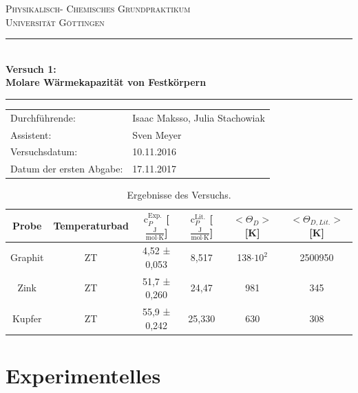 \documentclass[12pt,a4paper,titlepage,headinclude,bibtotoc]{scrartcl}
\begin{document}
\begin{titlepage}
\centering
\textsc{\Large Physikalisch- Chemisches Grundpraktikum\\[1.5ex] Universität Göttingen}

\vspace*{0.5cm}

\rule{\textwidth}{1pt}\\[0.5cm]
{\huge \bfseries
  Versuch 1: \\[1.5ex]
  Molare Wärmekapazität von Festkörpern }\\[0.5cm]
\rule{\textwidth}{1pt}

\vspace*{0.5cm}


\begin{Large}
\begin{tabular}{ll}
Durchführende: &  Isaac Maksso, Julia Stachowiak\\
Assistent: & Sven Meyer \\
 Versuchsdatum: & 10.11.2016\\
 Datum der ersten Abgabe: & 17.11.2017\\
\end{tabular}
\end{Large}

\vspace*{0.5cm}


\begin{table}[h!]
\centering
\caption{Ergebnisse des Versuchs.}
\begin{tabular}{c|c|c|c||c|c}
Probe&Temperaturbad&$\text{c}_P^{\text{Exp.}}$ [$\frac{\text{J}}{\text{mol}\cdot\text{K}}$] &$\text{c}_P^{\text{Lit.}}$ [$\frac{\text{J}}{\text{mol}\cdot\text{K}}$] & $<\Theta_D >$ [K]& $<\Theta_{D,Lit.}>$ [K] \\
\hline
Graphit& ZT&4,52 ± 0,053  &8,517& 138$ \cdot 10^2$& 2500950\\
\hline
Zink &ZT& 51,7 ± 0,260 &24,47& 981 & 345\\
\hline
Kupfer &ZT&55,9 ± 0,242 &25,330& 630 &308\\
\end{tabular}
\end{table}
\end{titlepage}


\tableofcontents

\newpage


\section{Experimentelles}
\end{document}
